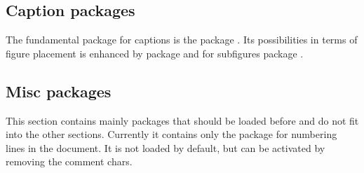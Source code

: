 

\subsection{Caption packages}
\label{sec:packages:caption}

The fundamental package for captions is the package .  Its possibilities in terms of figure placement is enhanced by package  and for subfigures package .



\subsection{Misc packages}
\label{sec:packages:misc}
This section contains mainly packages that should be loaded before  and do not fit into the other sections.
Currently it contains only the package  for numbering lines
in the document. It is not loaded by default, but can be activated by removing the comment chars.

